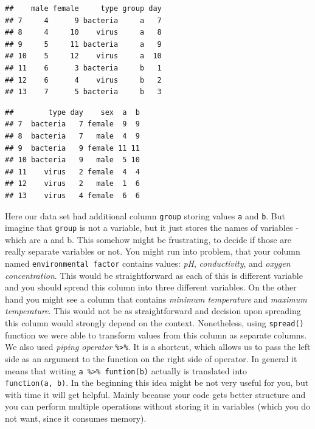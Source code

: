 \documentclass[]{book}
\newenvironment{Shaded}{\begin{snugshade}}{\end{snugshade}}
\newcommand{\KeywordTok}[1]{\textcolor[rgb]{0.13,0.29,0.53}{\textbf{#1}}}
\newcommand{\DecValTok}[1]{\textcolor[rgb]{0.00,0.00,0.81}{#1}}
\newcommand{\StringTok}[1]{\textcolor[rgb]{0.31,0.60,0.02}{#1}}
\newcommand{\OperatorTok}[1]{\textcolor[rgb]{0.81,0.36,0.00}{\textbf{#1}}}
\newcommand{\NormalTok}[1]{#1}
\theoremstyle{definition}
\theoremstyle{definition}
\theoremstyle{definition}
\theoremstyle{remark}
\begin{document}
\begin{verbatim}
##    male female     type group day
## 7     4      9 bacteria     a   7
## 8     4     10    virus     a   8
## 9     5     11 bacteria     a   9
## 10    5     12    virus     a  10
## 11    6      3 bacteria     b   1
## 12    6      4    virus     b   2
## 13    7      5 bacteria     b   3
\end{verbatim}

\begin{Shaded}
\end{Shaded}

\begin{verbatim}
##        type day    sex  a  b
## 7  bacteria   7 female  9  9
## 8  bacteria   7   male  4  9
## 9  bacteria   9 female 11 11
## 10 bacteria   9   male  5 10
## 11    virus   2 female  4  4
## 12    virus   2   male  1  6
## 13    virus   4 female  6  6
\end{verbatim}

Here our data set had additional column \texttt{group} storing values
\texttt{a} and \texttt{b}. But imagine that \texttt{group} is not a
variable, but it just stores the names of variables - which are a and b.
This somehow might be frustrating, to decide if those are really
separate variables or not. You might run into problem, that your column
named \texttt{environmental\ factor} contains values: \emph{pH},
\emph{conductivity}, and \emph{oxygen concentration}. This would be
straightforward as each of this is different variable and you should
spread this column into three different variables. On the other hand you
might see a column that contains \emph{minimum temperature} and
\emph{maximum temperature}. This would not be as straightforward and
decision upon spreading this column would strongly depend on the
context. Nonetheless, using \texttt{spread()} function we were able to
transform values from this column as separate columns. We also used
\emph{piping operator} \texttt{\%\textgreater{}\%}. It is a shortcut,
which allows us to pass the left side as an argument to the function on
the right side of operator. In general it means that writing
\texttt{a\ \%\textgreater{}\%\ funtion(b)} actually is translated into
\texttt{function(a,\ b)}. In the beginning this idea might be not very
useful for you, but with time it will get helpful. Mainly because your
code gets better structure and you can perform multiple operations
without storing it in variables (which you do not want, since it
consumes memory).
\end{document}
